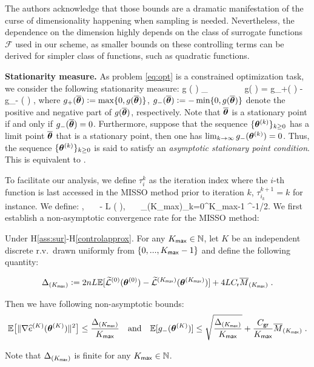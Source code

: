 \documentclass[final,12pt]{alt2022} %
\makeatletter
\DeclareRobustCommand*\cal{\@fontswitch\relax\mathcal}
\makeatother
\begin{document}
The authors acknowledge that those bounds are a dramatic manifestation of the curse of dimensionality happening when sampling is needed.
Nevertheless, the dependence on the dimension highly depends on the class of surrogate functions $\mathcal{F}$ used in our scheme, as smaller bounds on these controlling terms can be derived for simpler class of functions, such as quadratic functions.

\textbf{Stationarity measure.} As problem \eqref{eq:opt} is a constrained optimization task, we consider the following stationarity measure:
\beq \label{eq:stationary_meas}
g ( \op ) \eqdef \inf_{ \param \in \Param } \frac{ {\cal L}'( \op , \param - \op  ) }{ \| \op - \param \|}~~~~~~~~g( \op )  = g_+( \op )  - g_- ( \op ) \eqsp,
\eeq
where  $g_+ ( \op ) \eqdef \max\{ 0, g(\op) \}$, $g_- ( \op )  \eqdef - \min\{0, g(\op)\}$ denote the positive and negative part of $g( \op ) $, respectively.
Note that $\op$ is a stationary point if and only if $g_-( \op ) = 0$.
Furthermore, suppose that the sequence $\{ \hp{k} \}_{k \geq 0}$ has a limit point $\op$ that is a stationary point, then one has $\lim_{k \rightarrow \infty} g_-( \hp{k} ) = 0$.
Thus, the sequence $\{ \hp{k} \}_{k \geq 0}$ is said to satisfy an \emph{asymptotic stationary point condition}. This is equivalent to \cite[Definition 2.4]{mairal2015miso}.

To facilitate our analysis, we define $\tau_i^k$ as the iteration index where the $i$-th function is last accessed in the MISSO method prior to iteration $k$, $\tau_{i_k}^{k+1} = k$ for instance. We define:
{\small \beq\label{eq:sumsurrodet}
  ,~~~
 \eqdef {}- {\cal L} ( \param ),~~~ _{(K_{\sf max})}\eqdef \sum_{k=0}^{K_{\sf max}-1} ^{-1/2}\eqsp.
\eeq}
We first establish a non-asymptotic convergence rate for the MISSO method:
\vspace{0.05in}
\begin{theo} \label{thm:main}
Under H\ref{ass:sur}-H\ref{controlapprox}. For any $K_{\sf max} \in \NN$, let $K$ be an independent discrete r.v.~drawn uniformly from $\{0,...,K_{\sf max}-1\}$ and define the following quantity:

{\small $$\Delta_{( K_{\sf max} )} \eqdef 2 n L \EE[  \sumSur{0}{\hp{0}} - \sumSur{K_{\sf max}}{\hp{K_{\sf max}}} ] +  4 L C_{\sf r} \overline{M}_{(K_{\sf max})} \eqsp.$$}

Then we have following non-asymptotic bounds:
{\small \begin{align} \label{eq:misso_rate}
 \EE \big[ \| \grd \eSur{K}{\hp{K}} \|^2 \big]  \leq \frac{\Delta_{( K_{\sf max} )}}{K_{\sf max}} \quad \textrm{and} \quad \EE[ g_-( \hp{K} ) ]  \leq \sqrt{\frac{ \Delta_{( K_{\sf max} )} }{ K_{\sf max} }} + \frac{C_{\sf gr}}{K_{\sf max}}  \overline{M}_{(K_{\sf max})} \eqsp.
\end{align}
}
\end{theo}
\vspace{0.05in}
Note that $\Delta_{( K_{\sf max} )}$ is finite for any $K_{\sf max} \in \NN$. 
\end{document}
